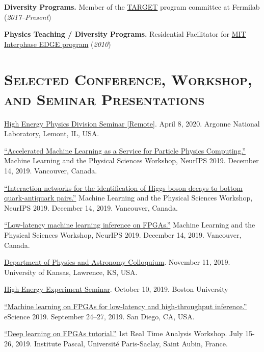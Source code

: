 \documentclass[11pt]{res}
\newcommand{\MarginText}[1]{\section{\textsc{#1}}\vspace{10pt}}
\begin{document}
\begin{resume}
\textbf{Diversity Programs.} Member of the \href{http://diversity.fnal.gov/target/}{TARGET} program committee at Fermilab (\textit{2017--Present})

\textbf{Physics Teaching / Diversity Programs.} Residential Facilitator for \href{http://ome.mit.edu/programs-services/program-overview}{MIT
  Interphase EDGE program} (\textit{2010})


\MarginText{Selected Conference, Workshop, and Seminar Presentations}

\href{https://indico.fnal.gov/event/22961/}{High Energy Physics Division Seminar [Remote]}. April 8, 2020. Argonne National Laboratory, Lemont, IL, USA.

\href{https://ml4physicalsciences.github.io/files/NeurIPS_ML4PS_2019_64.pdf}{``Accelerated Machine Learning as a Service for
Particle Physics Computing.''} Machine Learning and the Physical Sciences Workshop, NeurIPS 2019. December 14, 2019. Vancouver, Canada.

\href{https://ml4physicalsciences.github.io/files/NeurIPS_ML4PS_2019_71.pdf}{``Interaction networks for the identification of Higgs boson decays to bottom quark-antiquark pairs.''} Machine Learning and the Physical Sciences Workshop, NeurIPS 2019.  December 14, 2019. Vancouver, Canada.

\href{https://ml4physicalsciences.github.io/files/NeurIPS_ML4PS_2019_74.pdf}{``Low-latency machine learning inference on FPGAs.''} Machine Learning and the Physical Sciences Workshop, NeurIPS 2019.  December 14, 2019. Vancouver, Canada.

\href{https://physics.drupal.ku.edu/calendar/colloquia#/?i=2}{Department of Physics and Astronomy Colloquium}. November 11, 2019. University of Kansas, Lawrence, KS, USA.

\href{http://physics.bu.edu/events/show/2204}{High Energy Experiment Seminar}. October 10, 2019. Boston University

\href{https://escience2019.sdsc.edu/program}{``Machine
  learning on FPGAs for low-latency and high-throughput inference.''}
eScience 2019. September 24–27, 2019. San Diego, CA, USA.

\href{https://indico.cern.ch/event/793125/contributions/3495251/}{``Deep learning on FPGAs tutorial.''} 1st Real Time Analysis Workshop. July 15-26, 2019. Institute Pascal, Universit\'{e} Paris-Saclay, Saint Aubin, France.


\end{resume}
\end{document}
